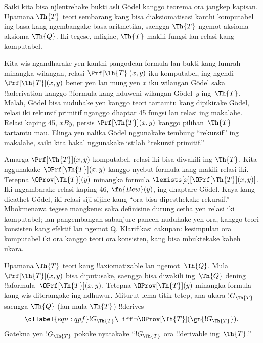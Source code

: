 \documentclass[../../../include/open-logic-section]{subfiles}
\begin{document}


Saiki kita bisa njlentrehake bukti asli G\"odel kanggo teorema ora
jangkep kapisan. Upamana $\Th{T}$ teori sembarang kang bisa
diaksiomatisasi kanthi komputabel ing basa kang ngembangake basa
aritmetika, saengga $\Th{T}$ ngemot aksioma-aksioma $\Th{Q}$. Iki
tegese, mligine, $\Th{T}$ makili fungsi lan relasi kang
komputabel.

Kita wis ngandharake yen kanthi pangodean formula lan bukti kang lumrah minangka
wilangan, relasi $\Prf[\Th{T}](x,y)$ iku komputabel, ing
ngendi $\Prf[\Th{T}](x,y)$ bener yen lan mung yen $x$ iku wilangan
G\"odel saka !!a{derivation} kanggo !!{formula} kang nduweni wilangan
G\"odel~$y$ ing~$\Th{T}$. Malah, G\"odel bisa nuduhake yen kanggo
teori tartamtu kang dipikirake G\"odel, relasi iki rekursif primitif
nganggo dhaptar 45 fungsi lan relasi ing makalahe. Relasi kaping 45,
$x B y$, persis $\Prf[\Th{T}](x,y)$ kanggo pilihan~$\Th{T}$
tartamtu mau. Elinga yen nalika G\"odel nggunakake tembung
``rekursif'' ing makalahe, saiki kita bakal nggunakake istilah
``rekursif primitif.''

Amarga $\Prf[\Th{T}](x,y)$ komputabel, relasi iki bisa
diwakili ing $\Th{T}$. Kita nggunakake
$\OPrf[\Th{T}](x,y)$ kanggo nyebut formula kang makili
relasi iki. Tetepna $\OProv[\Th{T}](y)$ minangka formula
$\lexists[x][\OPrf[\Th{T}](x,y)]$. Iki nggambarake relasi kaping 46,
$\fn{Bew}(y)$, ing dhaptare G\"odel. Kaya kang dicathet G\"odel, iki
relasi siji-sijine kang ``ora bisa dipesthekake rekursif.'' Mbokmenawa
tegese mangkene: saka definisine durung cetha yen relasi iki
komputabel; lan pangembangan sabanjure pancen nuduhake yen ora, kanggo teori konsisten kang efektif lan ngemot Q. Klarifikasi cakupan: kesimpulan ora komputabel iki ora kanggo teori ora konsisten, kang bisa mbuktekake kabeh ukara.

Upamana $\Th{T}$ teori kang !!{axiomatizable} lan ngemot~$\Th{Q}$.
Mula $\Prf[\Th{T}](x, y)$ bisa diputusake, saengga bisa
diwakili ing~$\Th{Q}$ dening
!!a{formula}~$\OPrf[\Th{T}](x, y)$. Tetepna $\OProv[\Th{T}](y)$
minangka formula kang wis diterangake ing ndhuwur. Miturut lema titik
tetep, ana ukara $!G_\Th{T}$ saengga $\Th{Q}$ (lan mula
$\Th{T}$) !!{derive}s
\begin{equation}
\ollabel{eqn:qpf}
!G_\Th{T} \liff \lnot \OProv[\Th{T}](\gn{!G_\Th{T}}).
\end{equation}
Gatekna yen $!G_\Th{T}$ pokoke nyatakake ``$!G_\Th{T}$
ora !!{derivable} ing~$\Th{T}$.'' 
\end{document}
